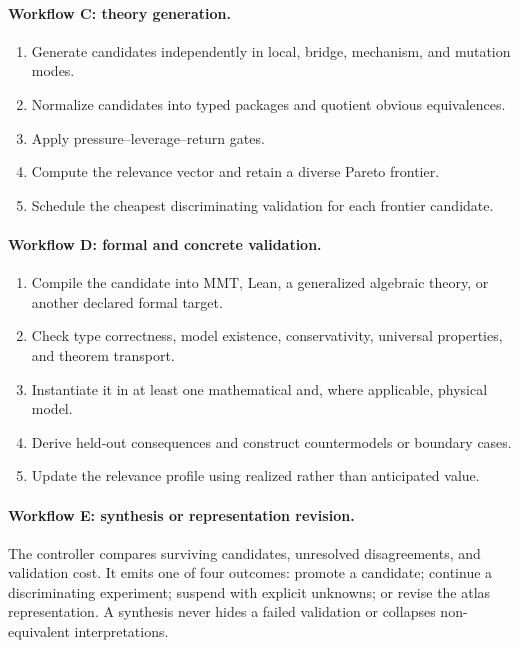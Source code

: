 \documentclass[11pt]{article}
\begin{document}
\paragraph{Workflow C: theory generation.}
\begin{enumerate}
  \item Generate candidates independently in local, bridge, mechanism, and mutation modes.
  \item Normalize candidates into typed packages and quotient obvious equivalences.
  \item Apply pressure--leverage--return gates.
  \item Compute the relevance vector and retain a diverse Pareto frontier.
  \item Schedule the cheapest discriminating validation for each frontier candidate.
\end{enumerate}

\paragraph{Workflow D: formal and concrete validation.}
\begin{enumerate}
  \item Compile the candidate into MMT, Lean, a generalized algebraic theory, or another declared
  formal target.
  \item Check type correctness, model existence, conservativity, universal properties, and theorem
  transport.
  \item Instantiate it in at least one mathematical and, where applicable, physical model.
  \item Derive held-out consequences and construct countermodels or boundary cases.
  \item Update the relevance profile using realized rather than anticipated value.
\end{enumerate}

\paragraph{Workflow E: synthesis or representation revision.}
The controller compares surviving candidates, unresolved disagreements, and validation cost. It emits
one of four outcomes: promote a candidate; continue a discriminating experiment; suspend with explicit
unknowns; or revise the atlas representation. A synthesis never hides a failed validation or collapses
non-equivalent interpretations.
\end{document}
